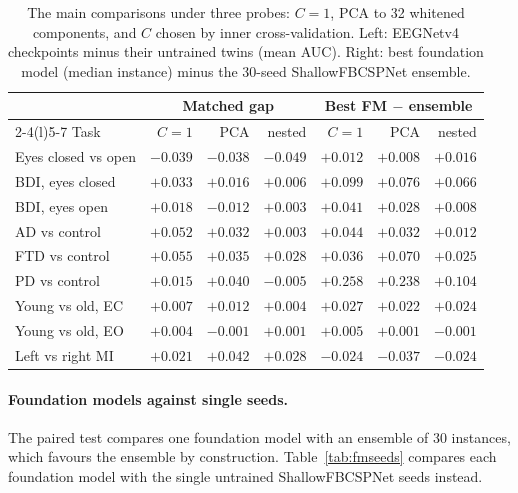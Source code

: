 \documentclass[11pt]{article}
\begin{document}
\begin{table}[h]
\centering\footnotesize\setlength{\tabcolsep}{4pt}
\caption{The main comparisons under three probes: $C = 1$, PCA to 32 whitened components, and
$C$ chosen by inner cross-validation. Left: EEGNetv4 checkpoints minus their untrained twins (mean
AUC). Right: best foundation model (median instance) minus the 30-seed ShallowFBCSPNet ensemble.}
\label{tab:probes}
\begin{tabular}{@{}lrrrrrr@{}}
\toprule
& \multicolumn{3}{c}{Matched gap} & \multicolumn{3}{c}{Best FM $-$ ensemble} \\
\cmidrule(lr){2-4}\cmidrule(l){5-7}
Task & $C = 1$ & PCA & nested & $C = 1$ & PCA & nested \\
\midrule
Eyes closed vs open & $-0.039$ & $-0.038$ & $-0.049$ & $+0.012$ & $+0.008$ & $+0.016$ \\
BDI, eyes closed & $+0.033$ & $+0.016$ & $+0.006$ & $+0.099$ & $+0.076$ & $+0.066$ \\
BDI, eyes open & $+0.018$ & $-0.012$ & $+0.003$ & $+0.041$ & $+0.028$ & $+0.008$ \\
AD vs control & $+0.052$ & $+0.032$ & $+0.003$ & $+0.044$ & $+0.032$ & $+0.012$ \\
FTD vs control & $+0.055$ & $+0.035$ & $+0.028$ & $+0.036$ & $+0.070$ & $+0.025$ \\
PD vs control & $+0.015$ & $+0.040$ & $-0.005$ & $+0.258$ & $+0.238$ & $+0.104$ \\
Young vs old, EC & $+0.007$ & $+0.012$ & $+0.004$ & $+0.027$ & $+0.022$ & $+0.024$ \\
Young vs old, EO & $+0.004$ & $-0.001$ & $+0.001$ & $+0.005$ & $+0.001$ & $-0.001$ \\
Left vs right MI & $+0.021$ & $+0.042$ & $+0.028$ & $-0.024$ & $-0.037$ & $-0.024$ \\
\bottomrule
\end{tabular}
\end{table}

\paragraph{Foundation models against single seeds.} The paired test compares one foundation
model with an ensemble of 30 instances, which favours the ensemble by construction.
Table~\ref{tab:fmseeds} compares each foundation model with the single untrained ShallowFBCSPNet
seeds instead.
\end{document}
